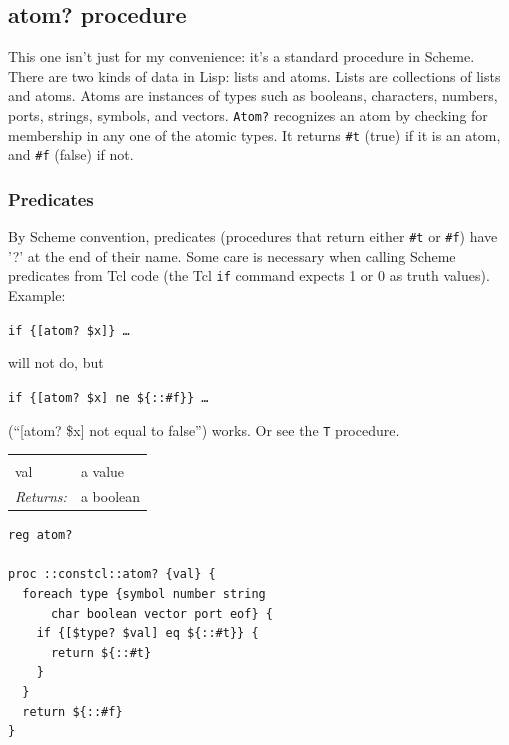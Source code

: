 \documentclass[a5paper,draft]{memoir}
\begin{document}
\subsection{atom? procedure}
\label{atom-procedure}

This one isn't just for my convenience: it's a standard procedure in Scheme. There are two kinds of data in Lisp: lists and atoms. Lists are collections of lists and atoms. Atoms are instances of types such as booleans, characters, numbers, ports, strings, symbols, and vectors. \texttt{Atom?} recognizes an atom by checking for membership in any one of the atomic types. It returns \texttt{\#t} (true) if it is an atom, and \texttt{\#f} (false) if not.

\begin{pulledtext}

\subsubsection{Predicates}
\label{predicates}

By Scheme convention, predicates (procedures that return either \texttt{\#t} or \texttt{\#f}) have '?' at the end of their name. Some care is necessary when calling Scheme predicates from Tcl code (the Tcl \texttt{if} command expects 1 or 0 as truth values). Example:

\texttt{if \{[atom? \$x]\} \ldots }

will not do, but

\texttt{if \{[atom? \$x] ne \$\{::\#f\}\} \ldots }

(``[atom? \$x] not equal to false'') works. Or see the \texttt{T} procedure.
\end{pulledtext}

\noindent\begin{tabular}{ |p{1.9cm} p{6.5cm}| }
\hline
\rowcolor[HTML]{CCCCCC} \multicolumn{2}{|l|}{\textbf{atom? (public)}} \\
val & a value \\
\textit{Returns:} & a boolean \\
\hline
\end{tabular}

\begin{lstlisting}
reg atom?

proc ::constcl::atom? {val} {
  foreach type {symbol number string
      char boolean vector port eof} {
    if {[$type? $val] eq ${::#t}} {
      return ${::#t}
    }
  }
  return ${::#f}
}
\end{lstlisting}
\end{document}
